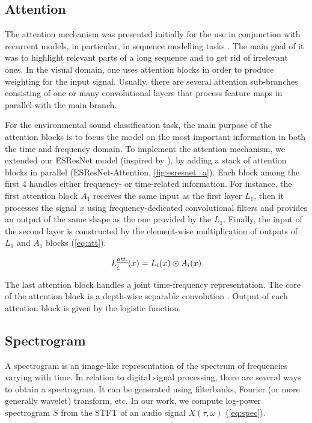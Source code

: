 \documentclass[a4paper,conference]{IEEEtran}
\begin{document}
\subsection{Attention} \label{ssec:attention}
The attention mechanism was presented initially for the use in conjunction with recurrent models, in particular, in sequence modelling tasks \cite{vaswani2017attention}.
The main goal of it was to highlight relevant parts of a long sequence and to get rid of irrelevant ones.
In the visual domain, one uses attention blocks in order to produce weighting for the input signal.
Usually, there are several attention sub-branches consisting of one or many convolutional layers that process feature maps in parallel with the main branch.

For the environmental sound classification task, the main purpose of the attention blocks is to focus the model on the most important information in both the time and frequency domain.
To implement the attention mechanism, we extended our \mbox{ESResNet} model (inspired by \cite{zhang2019crnn}), by adding a stack of attention blocks in parallel (\mbox{ESResNet-Attention}, \autoref{fig:esresnet_a}).
Each block among the first 4 handles either frequency- or time-related information.
For instance, the first attention block $A_{1}$ receives the same input as the first layer $L_{1}$, then it processes the signal $x$ using frequency-dedicated convolutional filters and provides an output of the same shape as the one provided by the $L_{1}$.
Finally, the input of the second layer is constructed by the element-wise multiplication of outputs of $L_{1}$ and $A_{1}$ blocks (\autoref{eq:att}).

\begin{equation}
    L_{\emph{i}}^{\emph{att.}}(x) = L_{i}(x) \odot A_{i}(x)
    \label{eq:att}
\end{equation}

The last attention block handles a joint time-frequency representation.
The core of the attention block is a depth-wise separable convolution \cite{chollet2017xception}.
Output of each attention block is given by the logistic function.

\subsection{Spectrogram} \label{ssec:spec}
A spectrogram is an image-like representation of the spectrum of frequencies varying with time.
In relation to digital signal processing, there are several ways to obtain a spectrogram.
It can be generated using filterbanks, Fourier (or more generally wavelet) transform, etc.
In our work, we compute log-power spectrogram $S$ from the STFT of an audio signal $X(\tau, \omega)$ (\autoref{eq:spec}).
\end{document}
